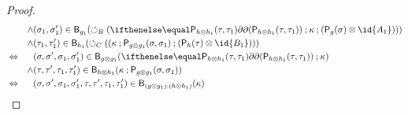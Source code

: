 \begin{proof}
\begin{align*}
&&\land& (\sigma_1,\sigma'_1) \in \best{g_1}(\fbk[B](\delay[\play{h \tensor h_1}(\tau,\tau_1)] \dcomp \kappa \dcomp (\play{g}(\sigma) \tensor \id{A_1}))) \\
&&\land& (\tau_1,\tau'_1) \in \best{h_1}(\fbk[C]((\kappa \dcomp \play{g \tensor g_1}(\sigma,\sigma_1) \dcomp (\play{h}(\tau) \tensor \id{B_1})))\\
&\iff &&(\sigma,\sigma',\sigma_1,\sigma'_1) \in \best{g \tensor g_1}(\delay[\play{h \tensor h_1}(\tau,\tau_1)] \dcomp \kappa) \\
&&\land& (\tau,\tau',\tau_1,\tau'_1) \in \best{h \tensor h_1}(\kappa \dcomp \play{g \tensor g_1}(\sigma,\sigma_1)) \\
&\iff &&(\sigma,\sigma',\sigma_1,\sigma'_1,\tau,\tau',\tau_1,\tau'_1) \in \best{(g \tensor g_1) \dcomp (h \tensor h_1)}(\kappa)
\end{align*}
\end{proof}

